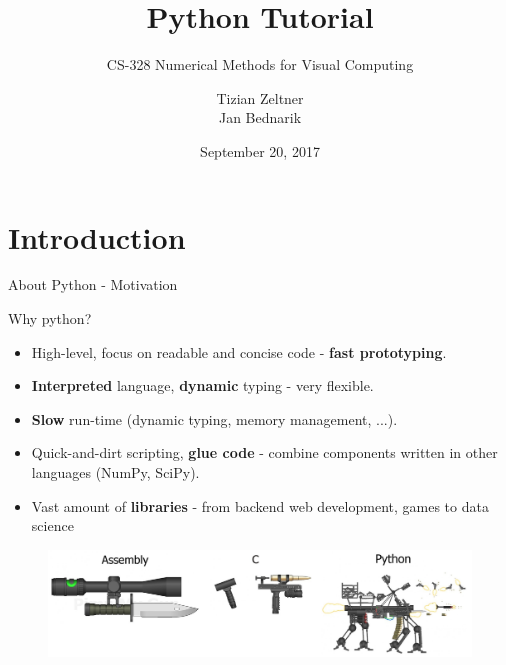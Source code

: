 \documentclass[10pt]{beamer}
\title{Python Tutorial}
\subtitle{CS-328 Numerical Methods for Visual Computing}
\date{September 20, 2017}
\author{Tizian Zeltner\\
Jan Bednarik}
\begin{document}
\maketitle


\section{Introduction}

\begin{frame}{About Python - Motivation}

	Why python?

	\begin{itemize}
	\item \pause High-level, focus on readable and concise code - \textbf{fast prototyping}.
	\item \pause \textbf{Interpreted} language, \textbf{dynamic} typing - very flexible.
	\item \pause \textbf{Slow} run-time (dynamic typing, memory management, ...).
	\item \pause Quick-and-dirt scripting, \textbf{glue code} - combine components written in other languages (NumPy, SciPy).
	\item \pause Vast amount of \textbf{libraries} - from backend web development, games to data science
	\end{itemize}

	\pause
	\begin{figure}[!h]
		\centering
		\includegraphics[width=0.9\linewidth]{img/python_vs_others.png}
	\end{figure}

\end{frame}

\end{document}
